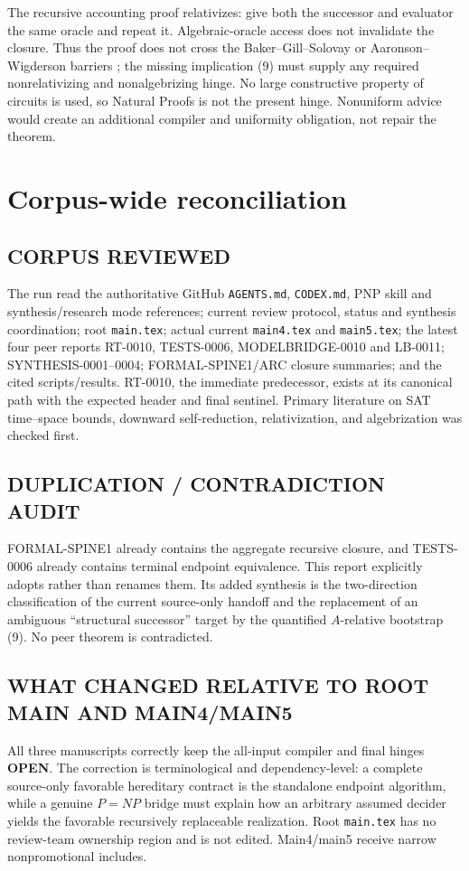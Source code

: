 \documentclass[11pt]{article}
\newcommand{\OPEN}{\textbf{OPEN}}
\begin{document}
The recursive accounting proof relativizes: give both the successor and
evaluator the same oracle and repeat it.  Algebraic-oracle access does not
invalidate the closure.  Thus the proof does not cross the Baker--Gill--Solovay
or Aaronson--Wigderson barriers \cite{bgs,aw}; the missing implication (9) must
supply any required nonrelativizing and nonalgebrizing hinge.  No large
constructive property of circuits is used, so Natural Proofs is not the
present hinge.  Nonuniform advice would create an additional compiler and
uniformity obligation, not repair the theorem.

\section{Corpus-wide reconciliation}

\subsection*{CORPUS REVIEWED}
The run read the authoritative GitHub \texttt{AGENTS.md}, \texttt{CODEX.md},
PNP skill and synthesis/research mode references; current review protocol,
status and synthesis coordination; root \texttt{main.tex}; actual current
\texttt{main4.tex} and \texttt{main5.tex}; the latest four peer reports
RT-0010, TESTS-0006, MODELBRIDGE-0010 and LB-0011; SYNTHESIS-0001--0004;
FORMAL-SPINE1/ARC closure summaries; and the cited scripts/results.  RT-0010,
the immediate predecessor, exists at its canonical path with the expected
header and final sentinel.  Primary literature on SAT time--space bounds,
downward self-reduction, relativization, and algebrization was checked first.

\subsection*{DUPLICATION / CONTRADICTION AUDIT}
FORMAL-SPINE1 already contains the aggregate recursive closure, and TESTS-0006
already contains terminal endpoint equivalence.  This report explicitly
adopts rather than renames them.  Its added synthesis is the two-direction
classification of the current source-only handoff and the replacement of an
ambiguous ``structural successor'' target by the quantified $A$-relative
bootstrap (9).  No peer theorem is contradicted.

\subsection*{WHAT CHANGED RELATIVE TO ROOT MAIN AND MAIN4/MAIN5}
All three manuscripts correctly keep the all-input compiler and final hinges
\OPEN.  The correction is terminological and dependency-level: a complete
source-only favorable hereditary contract is the standalone endpoint
algorithm, while a genuine $P=NP$ bridge must explain how an arbitrary
assumed decider yields the favorable recursively replaceable realization.
Root \texttt{main.tex} has no review-team ownership region and is not edited.
Main4/main5 receive narrow nonpromotional includes.
\end{document}
